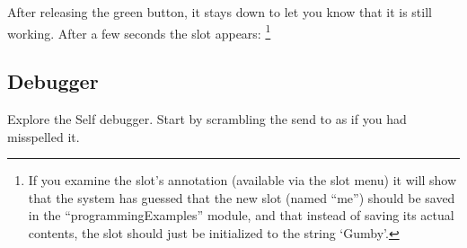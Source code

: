 \documentclass[letterpaper,10pt,english]{sphinxmanual}
\begin{document}
After releasing the green button, it stays down to let you know that it is still working. After a few
seconds the slot appears: \footnote{
If you examine the slot’s annotation (available via the slot menu) it will show that the system has guessed that the new slot (named “me”) should be saved in the “programmingExamples” module, and that instead of saving its actual contents, the slot should just be initialized to the string ‘Gumby’.
}
\begin{figure}[htbp]\begin{flushleft}

\end{flushleft}\end{figure}


\subsection{Debugger}
\label{howtoprg:debugger}
Explore the Self debugger. Start by scrambling the send to  as
if you had misspelled it.
\begin{figure}[htbp]\begin{flushleft}

\end{flushleft}\end{figure}
\end{document}
